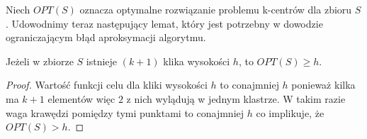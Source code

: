 \noindent
Niech $OPT(S)$ oznacza optymalne rozwiązanie problemu k-centrów dla zbioru $S$.
Udowodnimy teraz następujący lemat, który jest potrzebny w dowodzie ograniczającym błąd aproksymacji algorytmu.

\begin{lemma}
    Jeżeli w zbiorze $S$ istnieje $(k+1)$ klika wysokości $h$, to $OPT(S) \geq h$.
\end{lemma}

\begin{proof}
    Wartość funkcji celu dla kliki wysokości $h$ to conajmniej $h$ ponieważ kilka ma $k+1$ elementów więc $2$ z nich wylądują w jednym klastrze.
    W takim razie waga krawędzi pomiędzy tymi punktami to conajmniej $h$ co implikuje, że $OPT(S) > h$.
\end{proof}

